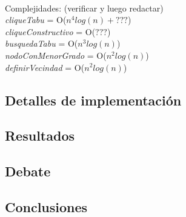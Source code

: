 \paragraph{}
Complejidades: (verificar y luego redactar) \\
\textit{cliqueTabu} = O($n^4 log(n) + ???$) \\
\tab \textit{cliqueConstructivo} = O($???$) \\
\tab \textit{busquedaTabu} = O($n^3 log(n)$) \\
\tab \tab \textit{nodoConMenorGrado} = O($n^2 log(n)$) \\
\tab \tab \textit{definirVecindad} = O($n^2 log(n)$) \\

\subsection{Detalles de implementación}
\subsection{Resultados}
\subsection{Debate}
\subsection{Conclusiones}
